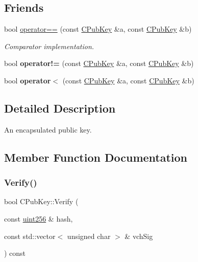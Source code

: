 \subsection*{Friends}
\begin{DoxyCompactItemize}
\item 
\mbox{\label{class_c_pub_key_a864b3cdcb46fb85c1fc07e0686cc3a31}} 
bool \mbox{\hyperlink{class_c_pub_key_a864b3cdcb46fb85c1fc07e0686cc3a31}{operator==}} (const \mbox{\hyperlink{class_c_pub_key}{C\+Pub\+Key}} \&a, const \mbox{\hyperlink{class_c_pub_key}{C\+Pub\+Key}} \&b)
\begin{DoxyCompactList}\small\item\em Comparator implementation. \end{DoxyCompactList}\item 
\mbox{\label{class_c_pub_key_af660fd5a8d213211dfff37a2296d09e1}} 
bool {\bfseries operator!=} (const \mbox{\hyperlink{class_c_pub_key}{C\+Pub\+Key}} \&a, const \mbox{\hyperlink{class_c_pub_key}{C\+Pub\+Key}} \&b)
\item 
\mbox{\label{class_c_pub_key_af814095b2c92bedd96a83a0811d52da9}} 
bool {\bfseries operator$<$} (const \mbox{\hyperlink{class_c_pub_key}{C\+Pub\+Key}} \&a, const \mbox{\hyperlink{class_c_pub_key}{C\+Pub\+Key}} \&b)
\end{DoxyCompactItemize}


\subsection{Detailed Description}
An encapsulated public key. 

\subsection{Member Function Documentation}
\mbox{\label{class_c_pub_key_a5b3fef213b227394ca9d0a1e3baa957e}} 
\subsubsection{\texorpdfstring{Verify()}{Verify()}}
{\footnotesize\ttfamily bool C\+Pub\+Key\+::\+Verify (\begin{DoxyParamCaption}\item[{const \mbox{\hyperlink{classuint256}{uint256}} \&}]{hash,  }\item[{const std\+::vector$<$ unsigned char $>$ \&}]{vch\+Sig }\end{DoxyParamCaption}) const}

